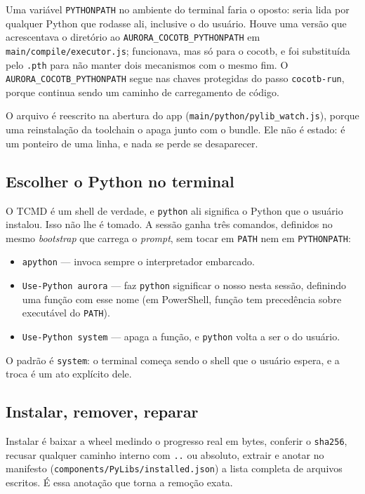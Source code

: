 \documentclass[11pt,a4paper]{article}
\begin{document}
Uma variável \texttt{PYTHONPATH} no ambiente do terminal faria o oposto: seria
lida por qualquer Python que rodasse ali, inclusive o do usuário. Houve uma versão
que acrescentava o diretório ao \texttt{AURORA\_COCOTB\_PYTHONPATH} em
\texttt{main/compile/executor.js}; funcionava, mas só para o cocotb, e foi
substituída pelo \texttt{.pth} para não manter dois mecanismos com o mesmo fim. O
\texttt{AURORA\_COCOTB\_PYTHONPATH} segue nas chaves protegidas do passo
\texttt{cocotb-run}, porque continua sendo um caminho de carregamento de código.

O arquivo é reescrito na abertura do app (\texttt{main/python/pylib\_watch.js}),
porque uma reinstalação da toolchain o apaga junto com o bundle. Ele não é estado:
é um ponteiro de uma linha, e nada se perde se desaparecer.

\subsection{Escolher o Python no terminal}

O TCMD é um shell de verdade, e \texttt{python} ali significa o Python que o
usuário instalou. Isso não lhe é tomado. A sessão ganha três comandos, definidos
no mesmo \emph{bootstrap} que carrega o \emph{prompt}, sem tocar em
\texttt{PATH} nem em \texttt{PYTHONPATH}:

\begin{itemize}
  \item \texttt{apython} — invoca sempre o interpretador embarcado.
  \item \texttt{Use-Python aurora} — faz \texttt{python} significar o nosso nesta
        sessão, definindo uma função com esse nome (em PowerShell, função tem
        precedência sobre executável do \texttt{PATH}).
  \item \texttt{Use-Python system} — apaga a função, e \texttt{python} volta a ser
        o do usuário.
\end{itemize}

O padrão é \texttt{system}: o terminal começa sendo o shell que o usuário espera,
e a troca é um ato explícito dele.

\subsection{Instalar, remover, reparar}

Instalar é baixar a wheel medindo o progresso real em bytes, conferir o
\texttt{sha256}, recusar qualquer caminho interno com \texttt{..} ou absoluto,
extrair e anotar no manifesto (\texttt{components/PyLibs/installed.json}) a lista
completa de arquivos escritos. É essa anotação que torna a remoção exata.
\end{document}
